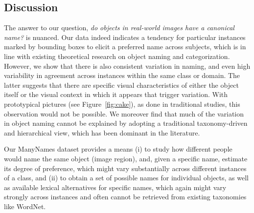 
\subsection{Discussion}
\label{subsec:discuss}


The answer to our question, \textit{do objects in real-world images have a canonical name?} is nuanced. 
Our data indeed indicates a tendency for particular instances marked by bounding boxes to elicit a preferred name across subjects, which is in line with existing theoretical research on object naming and categorization. 
However, we show that there is also consistent variation in naming, and even high variability in agreement across instances within the same class or domain. 
The latter suggests that there are specific visual characteristics of either the object itself or the visual context in which it appears that trigger variation. With prototypical pictures (see Figure\ \ref{fig:cake}), as done in traditional studies, this observation would not be possible.
We moreover find that much of the variation in object naming cannot be explained by adopting a traditional taxonomy-driven and hierarchical view, which has been dominant in the literature.

Our ManyNames dataset provides a means 
(i) to study how different people would name the same object (image region),  
and, given a specific name, estimate its degree of preference, which might vary substantially across different instances of a class, and   
(ii) to obtain a set of possible names for individual objects, as well as available lexical alternatives for specific names, which again might vary strongly across instances and often cannot be retrieved from existing taxonomies like WordNet. 

